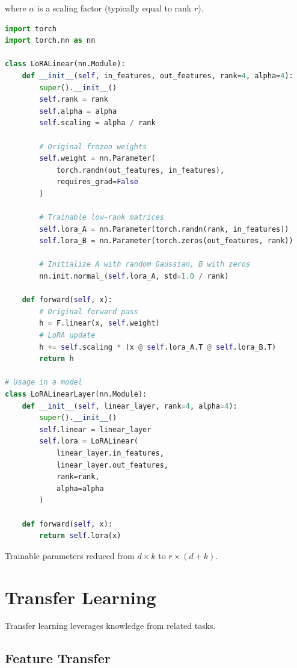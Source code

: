 where $\alpha$ is a scaling factor (typically equal to rank $r$).

\begin{code}
    \label{code:lora}
\begin{lstlisting}[language=python]
import torch
import torch.nn as nn

class LoRALinear(nn.Module):
    def __init__(self, in_features, out_features, rank=4, alpha=4):
        super().__init__()
        self.rank = rank
        self.alpha = alpha
        self.scaling = alpha / rank
        
        # Original frozen weights
        self.weight = nn.Parameter(
            torch.randn(out_features, in_features), 
            requires_grad=False
        )
        
        # Trainable low-rank matrices
        self.lora_A = nn.Parameter(torch.randn(rank, in_features))
        self.lora_B = nn.Parameter(torch.zeros(out_features, rank))
        
        # Initialize A with random Gaussian, B with zeros
        nn.init.normal_(self.lora_A, std=1.0 / rank)
    
    def forward(self, x):
        # Original forward pass
        h = F.linear(x, self.weight)
        # LoRA update
        h += self.scaling * (x @ self.lora_A.T @ self.lora_B.T)
        return h

# Usage in a model
class LoRALinearLayer(nn.Module):
    def __init__(self, linear_layer, rank=4, alpha=4):
        super().__init__()
        self.linear = linear_layer
        self.lora = LoRALinear(
            linear_layer.in_features,
            linear_layer.out_features,
            rank=rank,
            alpha=alpha
        )
    
    def forward(self, x):
        return self.lora(x)
\end{lstlisting}
\end{code}

Trainable parameters reduced from $d \times k$ to $r \times (d + k)$.

\section{Transfer Learning}

Transfer learning leverages knowledge from related tasks.

\subsection{Feature Transfer}

